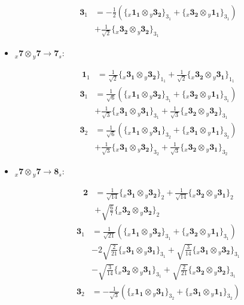 \documentclass[english]{article}
\newcommand{\rep}[1]{\mathbf{#1}}
\newcommand{\repx}[2]{{}_{#2}\mathbf{#1}}
\newcommand{\tsprodx}[2]{\repx{#1}{x}\otimes\repx{#2}{y}}
\newcommand{\subcgs}[3]{\big\{ \tsprodx{#1}{#2}\big\}^{}_{#3}}
\begin{document}
\begin{itemize}
\begin{fleqn}
\begin{align*}
\end{align*}
\begin{align*}
\rep{3}_{1} & = -\frac{1}{2}\left(\subcgs{1_{1}}{3_{2}}{3_{1}}+\subcgs{3_{2}}{1_{1}}{3_{1}}\right) \\ 
 & +\frac{1}{\sqrt{2}}\subcgs{3_{2}}{3_{2}}{3_{1}}
\end{align*}
\end{fleqn}
\item $\tsprodx{7}{7}\to\rep{7}_{s}$:
\begin{fleqn}
\begin{align*}
\rep{1}_{1} & = \frac{1}{\sqrt{2}}\subcgs{3_{1}}{3_{2}}{1_{1}}+\frac{1}{\sqrt{2}}\subcgs{3_{2}}{3_{1}}{1_{1}}
\end{align*}
\begin{align*}
\rep{3}_{1} & = \frac{1}{\sqrt{6}}\left(\subcgs{1_{1}}{3_{2}}{3_{1}}+\subcgs{3_{2}}{1_{1}}{3_{1}}\right) \\ 
 & +\frac{1}{\sqrt{3}}\subcgs{3_{1}}{3_{1}}{3_{1}}+\frac{1}{\sqrt{3}}\subcgs{3_{2}}{3_{2}}{3_{1}}
\end{align*}
\begin{align*}
\rep{3}_{2} & = \frac{1}{\sqrt{6}}\left(\subcgs{1_{1}}{3_{1}}{3_{2}}+\subcgs{3_{1}}{1_{1}}{3_{2}}\right) \\ 
 & +\frac{1}{\sqrt{3}}\subcgs{3_{1}}{3_{2}}{3_{2}}+\frac{1}{\sqrt{3}}\subcgs{3_{2}}{3_{1}}{3_{2}}
\end{align*}
\end{fleqn}
\item $\tsprodx{7}{7}\to\rep{8}_{s}$:
\begin{fleqn}
\begin{align*}
\rep{2} & = \frac{1}{\sqrt{14}}\subcgs{3_{1}}{3_{2}}{2}+\frac{1}{\sqrt{14}}\subcgs{3_{2}}{3_{1}}{2} \\ 
 & +\sqrt{\frac{6}{7}}\subcgs{3_{2}}{3_{2}}{2}
\end{align*}
\begin{align*}
\rep{3}_{1} & = \frac{1}{\sqrt{21}}\left(\subcgs{1_{1}}{3_{2}}{3_{1}}+\subcgs{3_{2}}{1_{1}}{3_{1}}\right) \\ 
 & -2 \sqrt{\frac{2}{21}}\subcgs{3_{1}}{3_{1}}{3_{1}}+\sqrt{\frac{3}{14}}\subcgs{3_{1}}{3_{2}}{3_{1}} \\ 
 & -\sqrt{\frac{3}{14}}\subcgs{3_{2}}{3_{1}}{3_{1}}+\sqrt{\frac{2}{21}}\subcgs{3_{2}}{3_{2}}{3_{1}}
\end{align*}
\begin{align*}
\rep{3}_{2} & = -\frac{1}{\sqrt{3}}\left(\subcgs{1_{1}}{3_{1}}{3_{2}}+\subcgs{3_{1}}{1_{1}}{3_{2}}\right) \\ 

\end{align*}
\end{fleqn}
\end{itemize}
\end{document}
